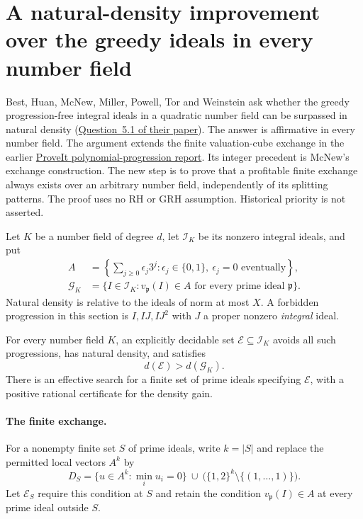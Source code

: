 \section{A natural-density improvement over the greedy ideals in every number field}
\label{sec:ideal-natural-gain}

Best, Huan, McNew, Miller, Powell, Tor and Weinstein ask whether the
greedy progression-free integral ideals in a quadratic number field can
be surpassed in natural density
(\href{https://arxiv.org/pdf/1412.0999}{Question~5.1 of their paper}).
The answer is affirmative in every number field. The argument extends
the finite valuation-cube exchange in the earlier
\href{https://github.com/VladimirReshetnikov/ProveIt/blob/5cc267af75a635199ac5d93a7d49cbce521daefc/docs/incoming/grh-progression-densities-and-cubic-prime-race.zip}{ProveIt polynomial-progression report}.
Its integer precedent is McNew's exchange construction. The new step
is to prove that a profitable finite exchange always exists over an
arbitrary number field, independently of its splitting patterns. The
proof uses no RH or GRH assumption. Historical priority is not asserted.

Let $K$ be a number field of degree $d$, let $\mathcal I_K$ be its nonzero
integral ideals, and put
\[
 \begin{aligned}
 A&=\left\{\sum_{j\ge0}\epsilon_j3^j:\epsilon_j\in\{0,1\},
                         \ \epsilon_j=0\text{ eventually}\right\},\\
 \mathcal G_K&=\{I\in\mathcal I_K:v_{\mathfrak p}(I)\in A
                         \text{ for every prime ideal }\mathfrak p\}.
 \end{aligned}
\]
Natural density is relative to the ideals of norm at most $X$.
A forbidden progression in this section is
$I,IJ,IJ^2$ with $J$ a proper nonzero \emph{integral} ideal.

\begin{theorem}\label{thm:ideal-natural-gain}
For every number field $K$, an explicitly decidable set
$\mathcal E\subseteq\mathcal I_K$ avoids all such progressions, has
natural density, and satisfies
\[
                         d(\mathcal E)>d(\mathcal G_K).
\]
There is an effective search for a finite set of prime ideals specifying
$\mathcal E$, with a positive rational certificate for the density gain.
\end{theorem}

\paragraph{The finite exchange.}
For a nonempty finite set $S$ of prime ideals, write $k=|S|$ and replace
the permitted local vectors $A^k$ by
\[
 D_S=\{u\in A^k:\min_i u_i=0\}
       \ \cup\ \bigl(\{1,2\}^k\setminus\{(1,\ldots,1)\}\bigr).
\]
Let $\mathcal E_S$ require this condition at $S$ and retain the condition
$v_{\mathfrak p}(I)\in A$ at every prime ideal outside $S$.

